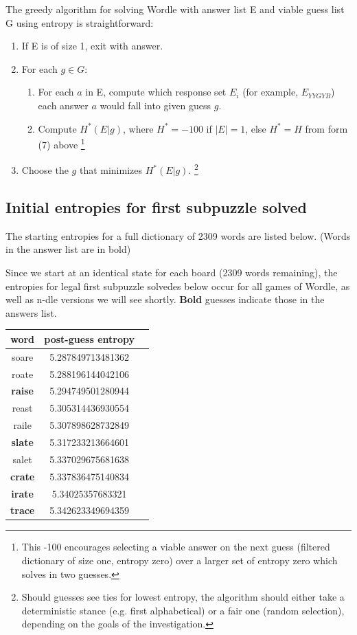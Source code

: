 \documentclass[11pt, oneside]{article} 	%
\begin{document}
The greedy algorithm for solving Wordle with answer list E and viable guess list G using entropy is straightforward:
\begin{enumerate}
\item If E is of size 1, exit with answer.
\item For each $g \in G$: 
 \begin{enumerate}
 \item For each $a$ in E, compute which response set $E_i$ (for example, $E_{YYGYB}$) each answer $a$ would fall into given guess $g$.
 \item Compute $H^*(E | g)$, where $H^* = -100$ if $|E| = 1$, else $H^* = H$ from form (7) above \footnote{This -100 encourages selecting a viable answer on the next guess (filtered dictionary of size one, entropy zero) over a larger set of entropy zero which solves in two guesses.}
 \end{enumerate}
\item Choose the $g$ that minimizes $H^*(E | g)$. \footnote{Should guesses see ties for lowest entropy, the algorithm should either take a deterministic stance (e.g. first alphabetical) or a fair one (random selection), depending on the goals of the investigation.}
\end{enumerate}

\subsection{Initial entropies for first subpuzzle solved}

The starting entropies for a full dictionary of 2309 words are listed below. (Words in the answer list are in bold)

Since we start at an identical state for each board (2309 words remaining), the entropies for legal first subpuzzle solvedes below occur for all games of Wordle, as well as n-dle versions we will see shortly. \textbf{Bold} guesses indicate those in the answers list.
\begin{center}
\begin{tabular}{ |c|c|c| }
 \hline
word & post-guess entropy \\
\hline
soare & 5.287849713481362 \\
roate & 5.288196144042106 \\
\textbf{raise} & 5.294749501280944 \\
reast & 5.305314436930554 \\
raile & 5.307898628732849 \\
\textbf{slate} & 5.317233213664601 \\
salet & 5.337029675681638 \\
\textbf{crate} & 5.337836475140834 \\
\textbf{irate} & 5.34025357683321 \\
\textbf{trace} & 5.342623349694359 \\
\hline
\end{tabular}
\end{center}
\end{document}
